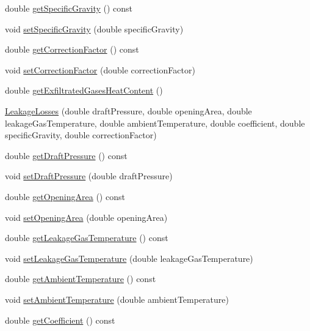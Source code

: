 \begin{DoxyCompactItemize}
\item 
double \hyperlink{class_leakage_losses_a37cd8c2282547246bab395424dad51d9}{get\+Specific\+Gravity} () const
\item 
void \hyperlink{class_leakage_losses_ab017828413655c5903374564e8718fac}{set\+Specific\+Gravity} (double specific\+Gravity)
\item 
double \hyperlink{class_leakage_losses_ad4f289a7490cd3fd4dfc4099fc4ad562}{get\+Correction\+Factor} () const
\item 
void \hyperlink{class_leakage_losses_a1af53750d5d9573dffa8674b3479e8d6}{set\+Correction\+Factor} (double correction\+Factor)
\item 
double \hyperlink{class_leakage_losses_a9663b916752bcf39a5482674e225e4a5}{get\+Exfiltrated\+Gases\+Heat\+Content} ()
\item 
\hyperlink{class_leakage_losses_ab29a3d7c9561d73f2530fc376b528510}{Leakage\+Losses} (double draft\+Pressure, double opening\+Area, double leakage\+Gas\+Temperature, double ambient\+Temperature, double coefficient, double specific\+Gravity, double correction\+Factor)
\item 
double \hyperlink{class_leakage_losses_a0ec89fc6371c4a788e1bb861c7cfba35}{get\+Draft\+Pressure} () const
\item 
void \hyperlink{class_leakage_losses_a33f31dc336fc6af0fd1e8c8739f37b1a}{set\+Draft\+Pressure} (double draft\+Pressure)
\item 
double \hyperlink{class_leakage_losses_a6b31fbefaa16a5a52ce423b9531e84fa}{get\+Opening\+Area} () const
\item 
void \hyperlink{class_leakage_losses_a417c9914af6b283695bdbd5e92451f9e}{set\+Opening\+Area} (double opening\+Area)
\item 
double \hyperlink{class_leakage_losses_a5dbb249c07bc91611b71d62610af7234}{get\+Leakage\+Gas\+Temperature} () const
\item 
void \hyperlink{class_leakage_losses_a379c88c8dea822636a1b9966e2408daa}{set\+Leakage\+Gas\+Temperature} (double leakage\+Gas\+Temperature)
\item 
double \hyperlink{class_leakage_losses_af67ad0af750484b13dd311c881f71c61}{get\+Ambient\+Temperature} () const
\item 
void \hyperlink{class_leakage_losses_aa6028111b3eb305d9ea6f9efea7c6c66}{set\+Ambient\+Temperature} (double ambient\+Temperature)
\item 
double \hyperlink{class_leakage_losses_a7f70af7175574e0c4447a322586ac01e}{get\+Coefficient} () const
\item 

\end{DoxyCompactItemize}
